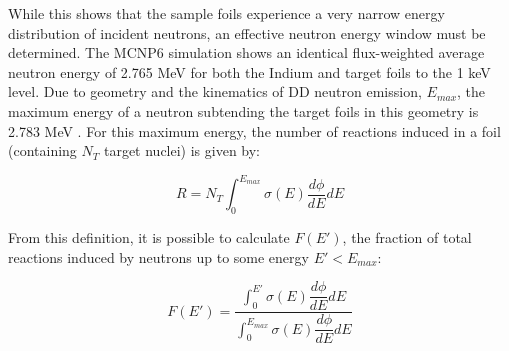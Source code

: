 \documentclass[5p]{elsarticle}
\newcommand{\pp}[1]{\left( #1\right)}
\newcommand{\comment}[1]{\todo[color=blue!20!white,inline]{ASV: #1}}
\begin{document}

While this shows that the sample foils experience a very narrow energy distribution of incident neutrons, an effective neutron energy window must be determined.
The MCNP6 simulation shows an identical flux-weighted average neutron energy of 2.765 MeV for both the Indium and target foils to the 1 keV level.
Due to geometry and the kinematics of DD neutron emission, $E_{max}$,  the maximum energy of a neutron subtending the target foils in this geometry is 2.783 MeV \cite{Liskien_Paulsen_1973}.
For this maximum energy, the number of reactions induced in a foil (containing $N_T$ target nuclei) is given by:

\begin{equation}
R = N_T \int_0^{E_{max}} \sigma(E) \dfrac{d\phi}{dE} dE
\end{equation}



From this definition, it is possible to calculate $F\pp{E'}$, the fraction of total reactions induced by neutrons up to some energy $E' < E_{max}$:

\begin{equation}\label{eqn:react_fraction}
F\pp{E'} = \dfrac{\int_0^{E'} \sigma(E) \dfrac{d\phi}{dE} dE}{\int_0^{E_{max}} \sigma(E) \dfrac{d\phi}{dE} dE}
\end{equation}



\end{document}
